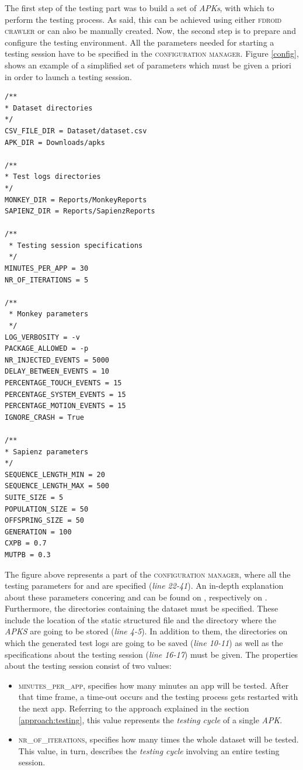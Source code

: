 The first step of the testing part was to build a set of \textit{APKs}, with which to perform the testing process. As said, this can be achieved using either \textsc{fdroid crawler} or can also be manually created. Now, the second step is to prepare and configure the testing environment. 
All the parameters needed for starting a testing session have to be specified in the \textsc{configuration manager}. Figure \ref{config}, shows an example of a simplified set of parameters which must be given a priori in order to launch a testing session. \newpage
\label{config}
\begin{lstlisting}[caption=Properties which get elaborated during the testing sessions]
/**
* Dataset directories
*/
CSV_FILE_DIR = Dataset/dataset.csv
APK_DIR = Downloads/apks 

/**
* Test logs directories
*/
MONKEY_DIR = Reports/MonkeyReports
SAPIENZ_DIR = Reports/SapienzReports

/**
 * Testing session specifications
 */
MINUTES_PER_APP = 30
NR_OF_ITERATIONS = 5

/**
 * Monkey parameters
 */
LOG_VERBOSITY = -v 
PACKAGE_ALLOWED = -p
NR_INJECTED_EVENTS = 5000
DELAY_BETWEEN_EVENTS = 10
PERCENTAGE_TOUCH_EVENTS = 15
PERCENTAGE_SYSTEM_EVENTS = 15
PERCENTAGE_MOTION_EVENTS = 15
IGNORE_CRASH = True

/**
* Sapienz parameters
*/
SEQUENCE_LENGTH_MIN = 20
SEQUENCE_LENGTH_MAX = 500
SUITE_SIZE = 5
POPULATION_SIZE = 50
OFFSPRING_SIZE = 50
GENERATION = 100
CXPB = 0.7
MUTPB = 0.3
\end{lstlisting}
The figure above represents a part of the \textsc{configuration manager}, where all the testing parameters for \monkey and \sapienz are specified (\textit{line 22-41}). An in-depth explanation about these parameters concering \monkey and \sapienz can be found on \cite{monkey}, respectively on \cite{sapienz}.\\
Furthermore, the directories containing the dataset must be specified. These include the location of the static structured file and the directory where the \textit{APKS} are going to be stored (\textit{line 4-5}).
In addition to them, the directories on which the generated test logs are going to be saved (\textit{line 10-11}) as well as the specifications about the testing session (\textit{line 16-17}) must be given. 
The properties about the testing session consist of two values: 
\begin{itemize}
\item \textsc{minutes\_per\_app}, specifies how many minutes an app will be tested. After that time frame, a time-out occurs and the testing process gets restarted with the next app. 
Referring to the approach explained in the section \ref{approach:testing}, this value represents the  \textit{testing cycle} of a single \textit{APK}.
\item \textsc{nr\_of\_iterations}, specifies how many times the whole dataset will be tested.
This value, in turn, describes the \textit{testing cycle} involving an entire testing session.
\end{itemize}

